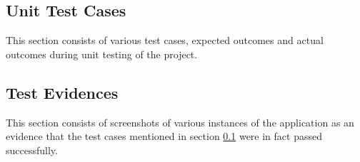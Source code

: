 \documentclass[12pt, a4paper, oneside]{article}
\begin{document}
\subsection{Unit Test Cases} \label{testcases}
This section consists of various test cases, expected outcomes and actual outcomes during unit testing of the project.

\pagebreak
{}

\subsection{Test Evidences}
This section consists of screenshots of various instances of the application as an evidence that the test cases mentioned in section \ref{testcases} were in fact passed successfully.
\end{document}
